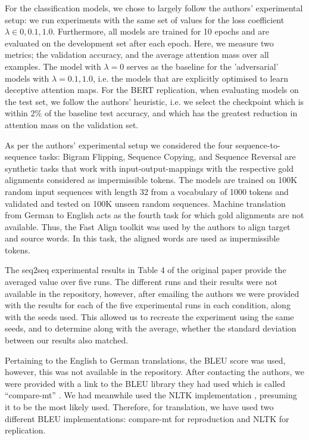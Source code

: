 For the classification models, we chose to largely follow the authors' experimental setup: we run experiments with the same set of values for the loss coefficient $\lambda \in {0, 0.1, 1.0}$. Furthermore, all models are trained for 10 epochs and are evaluated on the development set after each epoch. Here, we measure two metrics; the validation accuracy, and the average attention mass over all examples. The model with $\lambda = 0$ serves as the baseline for the 'adversarial' models with $\lambda = 0.1, 1.0$, i.e. the models that are explicitly optimised to learn deceptive attention maps. For the BERT replication, when evaluating models on the test set, we follow the authors' heuristic, i.e. we select the checkpoint which is within 2\% of the baseline test accuracy, and which has the greatest reduction in attention mass on the validation set.

As per the authors' experimental setup we considered the four sequence-to-sequence tasks:  Bigram Flipping, Sequence Copying, and Sequence Reversal are synthetic tasks that work with input-output-mappings with the respective gold alignments considered as impermissible tokens. The models are trained on 100K random input sequences with length 32 from a vocabulary of 1000 tokens and validated and tested on 100K unseen random sequences. Machine translation from German to English acts as the fourth task for which gold alignments are not available. Thus, the Fast Align toolkit \citep{dyer-etal-2013-simple} was used by the authors to align target and source words. In this task, the aligned words are used as impermissible tokens.

The seq2seq experimental results in Table 4 of the original paper provide the averaged value over five runs. The different runs and their results were not available in the repository, however, after emailing the authors we were provided with the results for each of the five experimental runs in each condition, along with the seeds used. This allowed us to recreate the experiment using the same seeds, and to determine along with the average, whether the standard deviation between our results also matched.

Pertaining to the English to German translations, the BLEU score was used, however, this was not available in the repository. After contacting the authors, we were provided with a link to the BLEU library they had used which is called ``compare-mt'' \citep{neubig-etal-2019-compare}. We had meanwhile used the NLTK implementation \citep{BirdKleinLoper09}, presuming it to be the most likely used. Therefore, for translation, we have used two different BLEU implementations: compare-mt for reproduction and NLTK for replication.

